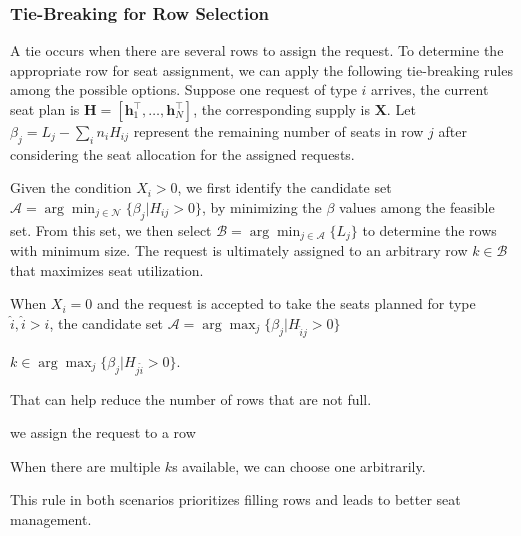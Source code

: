  \subsubsection*{Tie-Breaking for Row Selection}\label{tie-break}
 A tie occurs when there are several rows to assign the request. To determine the appropriate row for seat assignment, we can apply the following tie-breaking rules among the possible options. Suppose one request of type ${i}$ arrives, the current seat plan is $\bm{H} = [\bm{h}_{1}^{\intercal}, \ldots, \bm{h}_{N}^{\intercal}]$, the corresponding supply is $\bm{X}$. Let $\beta_{j} = L_j - \sum_{i} n_{i} H_{ij}$ represent the remaining number of seats in row $j$ after considering the seat allocation for the assigned requests. 
 
 Given the condition $X_{i} > 0$, we first identify the candidate set $\mathcal{A} =\arg \min_{j \in \mathcal{N}} \{\beta_{j}| H_{ij} > 0\}$, by minimizing the $\beta$ values among the feasible set. From this set, we then select $\mathcal{B} = \arg \min_{j \in \mathcal{A}} \{L_{j}\}$ to determine the rows with minimum size. The request is ultimately assigned to an arbitrary row $k \in \mathcal{B}$ that maximizes seat utilization. 
 
 When $X_{i} = 0$ and the request is accepted to take the seats planned for type $\hat{i}, \hat{i}>i$, 
 the candidate set $\mathcal{A} =\arg \max_{j} \{\beta_{j}| H_{\hat{i} j}>0 \}$
 
 $k \in \arg \max_{j} \{\beta_{j}| H_{j \hat{i}}>0\}$. 
 
 That can help reduce the number of rows that are not full. 
 
 we assign the request to a row 
 
 When there are multiple $k$s available, we can choose one arbitrarily. 
 
 This rule in both scenarios prioritizes filling rows and leads to better seat management.